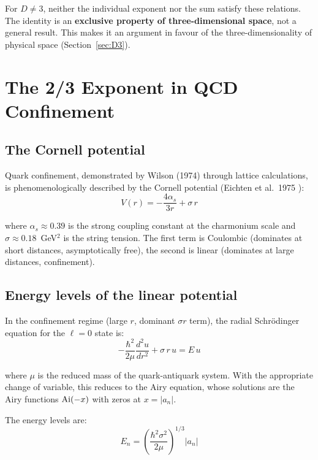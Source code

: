 \documentclass[10pt,a4paper]{article}
\begin{document}
For $D \neq 3$, neither the individual exponent nor the sum satisfy these relations. The identity is an \textbf{exclusive property of three-dimensional space}, not a general result. This makes it an argument in favour of the three-dimensionality of physical space (Section~\ref{sec:D3}).


\section{The 2/3 Exponent in QCD Confinement}\label{sec:qcd}

\subsection{The Cornell potential}

Quark confinement, demonstrated by Wilson (1974) \cite{Wilson1974} through lattice calculations, is phenomenologically described by the Cornell potential (Eichten et al.\ 1975 \cite{Cornell1975}):
\begin{equation}\label{eq:cornell}
V(r) = -\frac{4\alpha_s}{3r} + \sigma\,r
\end{equation}

where $\alpha_s \approx 0.39$ is the strong coupling constant at the charmonium scale and $\sigma \approx 0.18$~GeV$^2$ is the string tension. The first term is Coulombic (dominates at short distances, asymptotically free), the second is linear (dominates at large distances, confinement).

\subsection{Energy levels of the linear potential}

In the confinement regime (large $r$, dominant $\sigma r$ term), the radial Schr\"odinger equation for the $\ell = 0$ state is:
\begin{equation}
-\frac{\hbar^2}{2\mu}\frac{d^2u}{dr^2} + \sigma\,r\,u = E\,u
\end{equation}

where $\mu$ is the reduced mass of the quark-antiquark system. With the appropriate change of variable, this reduces to the Airy equation, whose solutions are the Airy functions ${\rm Ai}(-x)$ with zeros at $x = |a_n|$.

The energy levels are:
\begin{equation}\label{eq:airy}
E_n = \left(\frac{\hbar^2\sigma^2}{2\mu}\right)^{1/3} |a_n|
\end{equation}
\end{document}
